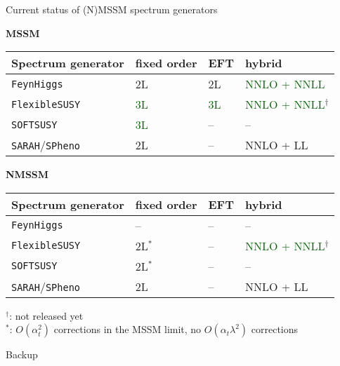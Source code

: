 \documentclass[hyperref={pdfpagelabels=false},ngerman]{beamer}
\renewcommand{\emph}{\textbf}
\newcommand{\FS}{\texttt{FlexibleSUSY}\xspace}
\newcommand{\FH}{\texttt{FeynHiggs}\xspace}
\newcommand{\SPheno}{\texttt{SPheno}\xspace}
\newcommand{\SARAH}{\texttt{SARAH}\xspace}
\newcommand{\SOFTSUSY}{\texttt{SOFTSUSY}\xspace}
\newcommand{\at}{\alpha_t}
\begin{document}
\begin{frame}{Current status of (N)MSSM spectrum generators}
  \begin{center}
    \emph{MSSM}\\[0.4em]
    \begin{tabular}{llll}
      \toprule
      Spectrum generator & fixed order & EFT & hybrid \\
      \midrule
      \FH                & 2L & 2L & \textcolor{darkgreen}{NNLO + NNLL} \\
      \FS                & \textcolor{darkgreen}{3L} & \textcolor{darkgreen}{3L} & \textcolor{darkgreen}{NNLO + NNLL}$^\dagger$ \\
      \SOFTSUSY          & \textcolor{darkgreen}{3L} & -- & -- \\
      \SARAH/\SPheno     & 2L & -- & NNLO + LL \\
      \bottomrule
    \end{tabular}
  \end{center}
  \begin{center}
    \emph{NMSSM}\\[0.4em]
    \begin{tabular}{llll}
      \toprule
      Spectrum generator & fixed order & EFT & hybrid \\
      \midrule
      \FH                & -- & -- & -- \\
      \FS                & 2L$^*$ & -- & \textcolor{darkgreen}{NNLO + NNLL}$^\dagger$ \\
      \SOFTSUSY          & 2L$^*$ & -- & -- \\
      \SARAH/\SPheno     & 2L & -- & NNLO + LL \\
      \bottomrule
    \end{tabular}
  \end{center}
  $^\dagger$: not released yet\\
  $^*$: $O(\at^2)$ corrections in the MSSM limit, no $O(\at\lambda^2)$ corrections
\end{frame}


\begin{frame}[noframenumbering]
  \begin{center}
    \Huge Backup
  \end{center}
\end{frame}

\end{document}
